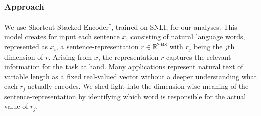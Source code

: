 \subsubsection{Approach}
We use Shortcut-Stacked Encoder\textsuperscript{$\dagger$}, trained on \ac{SNLI}, for our analyses. This model creates for input each sentence $x$, consisting of natural language words, represented as $x_i$, a sentence-representation $r \in \mathbb{R}^{2048}$ with $r_j$ being the $j$th dimension of $r$. Arising from $x$, the representation $r$ captures the relevant information for the task at hand. Many applications represent natural text of variable length as a fixed real-valued vector without a deeper understanding what each $r_j$ actually encodes. We shed light into the dimension-wise meaning of the sentence-representation by identifying which word is responsible for the actual value of $r_j$. 
